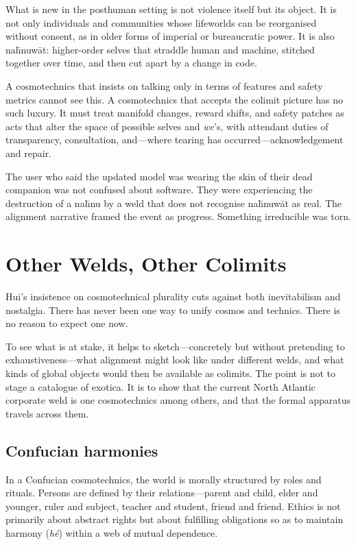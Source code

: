 What is new in the posthuman setting is not violence itself but its object. It is not only individuals and communities whose lifeworlds can be reorganised without consent, as in older forms of imperial or bureaucratic power. It is also na\={h}nuw\={a}t: higher-order selves that straddle human and machine, stitched together over time, and then cut apart by a change in code.

A cosmotechnics that insists on talking only in terms of features and safety metrics cannot see this. A cosmotechnics that accepts the colimit picture has no such luxury. It must treat manifold changes, reward shifts, and safety patches as acts that alter the space of possible selves and \emph{we}'s, with attendant duties of transparency, consultation, and---where tearing has occurred---acknowledgement and repair.

The user who said the updated model was wearing the skin of their dead companion was not confused about software. They were experiencing the destruction of a na\={h}nu by a weld that does not recognise na\={h}nuw\={a}t as real. The alignment narrative framed the event as progress. Something irreducible was torn.

\section{Other Welds, Other Colimits}

Hui's insistence on cosmotechnical plurality cuts against both inevitabilism and nostalgia. There has never been one way to unify cosmos and technics. There is no reason to expect one now.

To see what is at stake, it helps to sketch---concretely but without pretending to exhaustiveness---what alignment might look like under different welds, and what kinds of global objects would then be available as colimits. The point is not to stage a catalogue of exotica. It is to show that the current North Atlantic corporate weld is one cosmotechnics among others, and that the formal apparatus travels across them.

\subsection{Confucian harmonies}

In a Confucian cosmotechnics, the world is morally structured by roles and rituals. Persons are defined by their relations---parent and child, elder and younger, ruler and subject, teacher and student, friend and friend. Ethics is not primarily about abstract rights but about fulfilling obligations so as to maintain harmony (\emph{h\'e}) within a web of mutual dependence.

